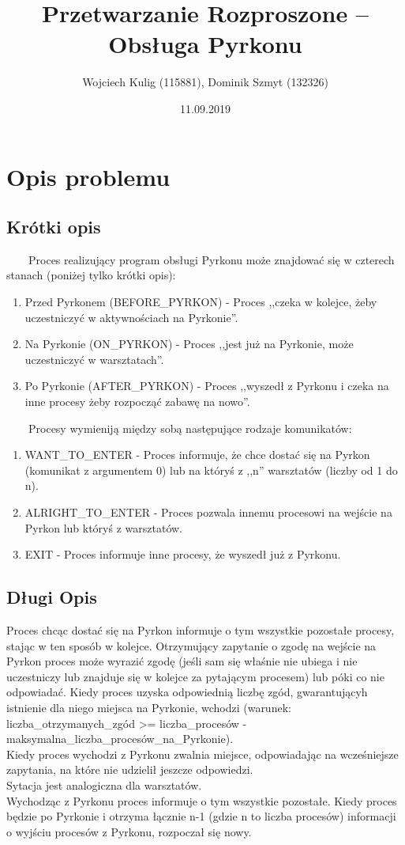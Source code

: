\documentclass[11pt]{article}
\title{Przetwarzanie Rozproszone -- Obsługa Pyrkonu}
\author{Wojciech Kulig (115881), Dominik Szmyt (132326)}
\date{11.09.2019}
\begin{document}
\maketitle

\section{Opis problemu}

\subsection{Krótki opis}
~~~~Proces realizujący program obsługi Pyrkonu może znajdować się w czterech stanach (poniżej tylko krótki opis):
\begin{enumerate}
\item Przed Pyrkonem (BEFORE\_PYRKON) - Proces ,,czeka w kolejce, żeby uczestniczyć w aktywnościach na Pyrkonie''.
\item Na Pyrkonie (ON\_PYRKON) - Proces ,,jest już na Pyrkonie, może uczestniczyć w warsztatach''.
\item Po Pyrkonie (AFTER\_PYRKON) - Proces ,,wyszedł z Pyrkonu i czeka na inne procesy żeby rozpocząć zabawę na nowo''.
\end{enumerate}
~~~~Procesy wymieniją między sobą następujące rodzaje komunikatów:
\begin{enumerate}
\item WANT\_TO\_ENTER - Proces informuje, że chce dostać się na Pyrkon (komunikat z argumentem 0) lub na któryś z ,,n'' warsztatów (liczby od 1 do n).
\item ALRIGHT\_TO\_ENTER - Proces pozwala innemu procesowi na wejście na Pyrkon lub któryś z warsztatów.
\item EXIT - Proces informuje inne procesy, że wyszedł już z Pyrkonu.
\end{enumerate}

\subsection{Długi Opis} 
Proces chcąc dostać się na Pyrkon informuje o tym wszystkie pozostałe procesy, stając w ten sposób w kolejce. Otrzymujący zapytanie o zgodę na wejście na Pyrkon proces może wyrazić zgodę (jeśli sam się właśnie nie ubiega i nie uczestniczy lub znajduje się w kolejce za pytającym procesem) lub póki co nie odpowiadać. Kiedy proces uzyska odpowiednią liczbę zgód, gwarantującyh istnienie dla niego miejsca na Pyrkonie, wchodzi (warunek: liczba\_otrzymanych\_zgód >= liczba\_procesów - maksymalna\_liczba\_procesów\_na\_Pyrkonie).\\
Kiedy proces wychodzi z Pyrkonu zwalnia miejsce, odpowiadając na wcześniejsze zapytania, na które nie udzielił jeszcze odpowiedzi.\\
Sytacja jest analogiczna dla warsztatów.\\
Wychodząc z Pyrkonu proces informuje o tym wszystkie pozostałe. Kiedy proces będzie po Pyrkonie i otrzyma łącznie n-1 (gdzie n to liczba procesów) informacji o wyjściu procesów z Pyrkonu, rozpoczał się nowy.\\
\end{document}
